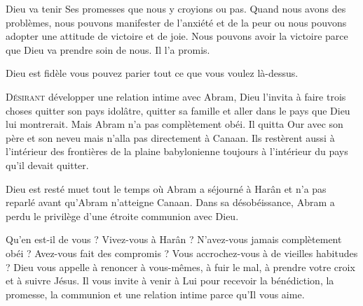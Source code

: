 Dieu va tenir Ses promesses que nous y croyions ou pas. Quand nous avons des
 problèmes, nous pouvons manifester de l'anxiété et de la peur ou nous pouvons
 adopter une attitude de victoire et de joie. Nous pouvons avoir la victoire
 parce que Dieu va prendre soin de nous. Il l'a promis.

Dieu est fidèle \ocadr{}vous pouvez parier tout ce que vous voulez là-dessus. 

\dvrule







\lettrine{D}{ésirant} développer une relation intime avec Abram,
 Dieu l'invita à faire trois choses\frcolon{} quitter son pays idolâtre,
 quitter sa famille et aller dans le pays que Dieu lui montrerait.
 Mais Abram n'a pas complètement obéi.
 Il quitta Our avec son père et son neveu mais n'alla pas directement
 à Canaan.
 Ils restèrent aussi à l'intérieur des frontières de la plaine babylonienne
 \ocadr{}toujours à l'intérieur du pays qu'il devait quitter. 


Dieu est resté muet tout le temps où Abram a séjourné à Harân
 et n'a pas reparlé avant qu'Abram n'atteigne Canaan.
 Dans sa désobéissance, Abram a perdu le privilège d'une étroite
 communion avec Dieu. 

Qu'en est-il de vous ? Vivez-vous à Harân ?
 N'avez-vous jamais complètement obéi ? Avez-vous fait des compromis ?
 Vous accrochez-vous à de vieilles habitudes ?
 Dieu vous appelle à renoncer à vous-mêmes, à fuir le mal,
 à prendre votre croix et à suivre Jésus.
 Il vous invite à venir à Lui pour recevoir la bénédiction,
 la promesse, la communion et une relation intime
 \ocadr{} parce qu'Il vous aime. 

